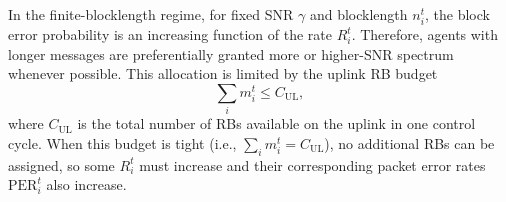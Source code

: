 \documentclass[conference]{IEEEtran}
\begin{document}
In the finite-blocklength regime, for fixed SNR $\gamma$ and blocklength $n_i^t$, the block error probability is an increasing function of the rate $R_i^t$. Therefore, agents with longer messages are preferentially granted more or higher-SNR spectrum whenever possible. This allocation is limited by the uplink RB budget
\[
\sum_i m_i^t \le C_{\mathrm{UL}},
\]
where $C_{\mathrm{UL}}$ is the total number of RBs available on the uplink in one control cycle. When this budget is tight (i.e., $\sum_i m_i^t = C_{\mathrm{UL}}$), no additional RBs can be assigned, so some $R_i^t$ must increase and their corresponding packet error rates $\mathrm{PER}_i^t$ also increase.








\end{document}
